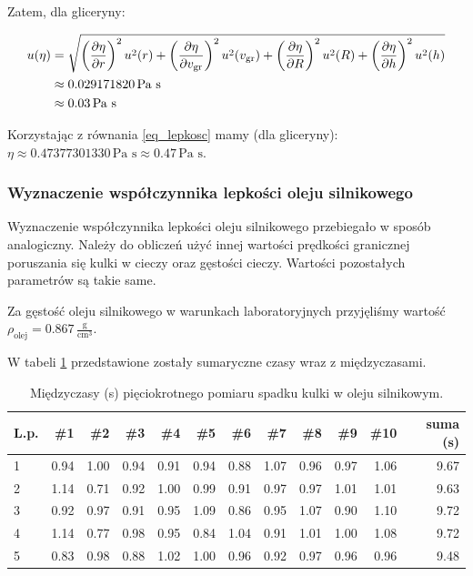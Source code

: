 \documentclass[a4paper]{article}
\begin{document}
Zatem, dla gliceryny:

\begin{align*}
	u(\eta) &= \sqrt{
	  \left(\frac{\partial \eta}{\partial r}\right)^2 u^2(r)
	+ \left(\frac{\partial \eta}{\partial v_{\text{gr}}}\right)^2 u^2(v_{\text{gr}})
	+ \left(\frac{\partial \eta}{\partial R}\right)^2 u^2(R)
	+ \left(\frac{\partial \eta}{\partial h}\right)^2 u^2(h)
	} \\
	&\approx 0.029171820 \, \text{Pa s}\\
	&\approx 0.03 \, \text{Pa s}
\end{align*}

Korzystając z równania \ref{eq_lepkosc} mamy (dla gliceryny): $\eta \approx 0.47377301330 \, \text{Pa s} \approx 0.47 \, \text {Pa s}$.

\subsubsection{Wyznaczenie współczynnika lepkości oleju silnikowego}

Wyznaczenie współczynnika lepkości oleju silnikowego przebiegało w sposób analogiczny.
Należy do obliczeń użyć innej wartości prędkości granicznej poruszania się kulki w cieczy oraz gęstości cieczy.
Wartości pozostałych parametrów są takie same.

Za gęstość oleju silnikowego w warunkach laboratoryjnych przyjęliśmy wartość $\rho_\text{olej} = 0.867 \, \frac{\text{g}}{\text{cm}^3}$.

W tabeli \ref{olej} przedstawione zostały sumaryczne czasy wraz z międzyczasami.

\begin{table}[h!]
	\centering
	\begin{tabular}{lrrrrrrrrrrr}
		\toprule
		L.p. &  \#1 &  \#2 &  \#3 &  \#4 &  \#5 &  \#6 &  \#7 &  \#8 &  \#9 &  \#10 & suma (s)\\
		\midrule
		1 &           0.94 &           1.00 &           0.94 &           0.91 &           0.94 &           0.88 &           1.07 &           0.96 &           0.97 &            1.06 & 9.67 \\
		2 &           1.14 &           0.71 &           0.92 &           1.00 &           0.99 &           0.91 &           0.97 &           0.97 &           1.01 &            1.01 & 9.63 \\
		3 &           0.92 &           0.97 &           0.91 &           0.95 &           1.09 &           0.86 &           0.95 &           1.07 &           0.90 &            1.10 & 9.72 \\
		4 &           1.14 &           0.77 &           0.98 &           0.95 &           0.84 &           1.04 &           0.91 &           1.01 &           1.00 &            1.08 & 9.72 \\
		5 &           0.83 &           0.98 &           0.88 &           1.02 &           1.00 &           0.96 &           0.92 &           0.97 &           0.96 &            0.96 & 9.48 \\
		\bottomrule
		\end{tabular}
	\caption{Międzyczasy (s) pięciokrotnego pomiaru spadku kulki w oleju silnikowym.}
	\label{olej}
\end{table}
\end{document}
